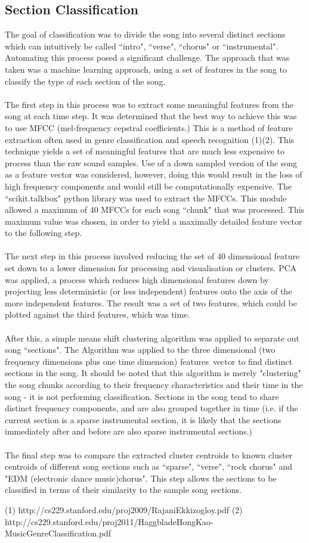 \subsection{Section Classification}
The goal of classification was to divide the song into several distinct sections which can intuitively be called ``intro", ``verse", ``chorus" or ``instrumental". Automating this process posed a significant challenge. The approach that was taken was a machine learning approach, using a set of features in the song to classify the type of each section of the song. \\
\\
The first step in this process was to extract some meaningful features from the song at each time step. It was determined that the best way to achieve this was to use MFCC (mel-frequency cepstral coefficients.) This is a method of feature extraction often used in genre classification and speech recognition (1)(2). This technique yields a set of meaningful features that are much less expensive to process than the raw sound samples. Use of a down sampled version of the song as a feature vector was considered, however, doing this would result in the loss of high frequency components and would still be computationally expensive. The ``scikit.talkbox" python library was used to extract the MFCCs. This module allowed a maximum of 40 MFCCs for each song ``chunk" that was processed. This maximum value was chosen, in order to yield a maximally detailed feature vector to the following step.\\
\\
The next step in this process involved reducing the set of 40 dimensional feature set down to a lower dimension for processing and visualisation or clusters. PCA was applied, a process which reduces high dimensional features down by projecting less deterministic (or less independent) features onto the axis of the more independent features. The result was a set of two features, which could be plotted against the third features, which was time. \\
\\
After this, a simple means shift clustering algorithm was applied to separate out song ``sections". The Algorithm was applied to the three dimensional (two frequency dimensions plus one time dimension) features\ vector to find distinct sections in the song. It should be noted that this algorithm is merely "clustering" the song chunks according to their frequency characteristics and their time in the song - it is not performing classification. Sections in the song tend to share distinct frequency components, and are also grouped together in time (i.e. if the current section is a sparse instrumental section, it is likely that the sections immediately after and before are also sparse instrumental sections.)\\
\\
The final step was to compare the extracted cluster centroids to known cluster centroids of different song sections such as ``sparse", ``verse", ``rock chorus" and "EDM (electronic dance music)chorus". This step allows the sections to be classified in terms of their similarity to the sample song sections. 



(1) http://cs229.stanford.edu/proj2009/RajaniEkkizogloy.pdf
(2)	http://cs229.stanford.edu/proj2011/HaggbladeHongKao-MusicGenreClassification.pdf
